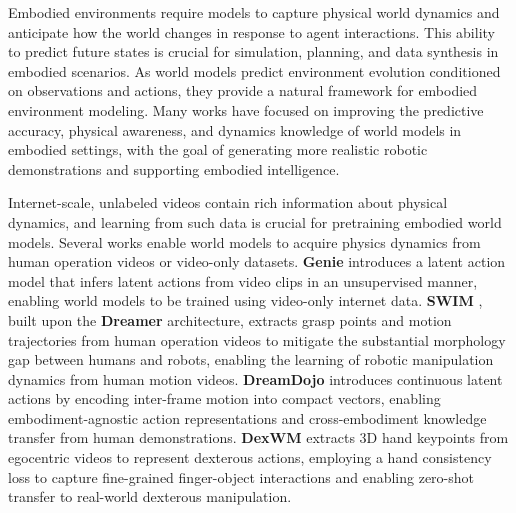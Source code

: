 Embodied environments require models to capture physical world dynamics and anticipate how the world changes in response to agent interactions. This ability to predict future states is crucial for simulation, planning, and data synthesis in embodied scenarios. As world models predict environment evolution conditioned on observations and actions, they provide a natural framework for embodied environment modeling. Many works have focused on improving the predictive accuracy, physical awareness, and dynamics knowledge of world models in embodied settings, with the goal of generating more realistic robotic demonstrations and supporting embodied intelligence.



Internet-scale, unlabeled videos contain rich information about physical dynamics, and learning from such data is crucial for pretraining embodied world models. Several works enable world models to acquire physics dynamics from human operation videos or video-only datasets. \textbf{Genie} \cite{Genie}  introduces a latent action model that infers latent actions from video clips in an unsupervised manner, enabling world models to be trained using video-only internet data. \textbf{SWIM} \cite{SWIM}, built upon the \textbf{Dreamer} \cite{PlaNet, Dreamer2, Dreamer3} architecture, extracts grasp points and motion trajectories from human operation videos to mitigate the substantial morphology gap between humans and robots, enabling the learning of robotic manipulation dynamics from human motion videos. \textbf{DreamDojo} \cite{DreamDojo} introduces continuous latent actions by encoding inter-frame motion into compact vectors, enabling embodiment-agnostic action representations and cross-embodiment knowledge transfer from human demonstrations. \textbf{DexWM} \cite{DexWM} extracts 3D hand keypoints from egocentric videos to represent dexterous actions, employing a hand consistency loss to capture fine-grained finger-object interactions and enabling zero-shot transfer to real-world dexterous manipulation.


